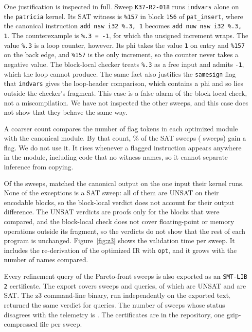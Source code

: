 One justification is inspected in full. Sweep \texttt{K37-R2-018} runs \texttt{indvars} alone on the \texttt{patricia} kernel. Its
SAT witness is \texttt{\%157} in block \texttt{156} of \texttt{pat\_\allowbreak{}insert}, where the canonical instruction
\texttt{add nsw i32 \%.\allowbreak{}3, 1} becomes \texttt{add nuw nsw i32 \%.\allowbreak{}3, 1}. The counterexample is \texttt{\%.\allowbreak{}3 = -1}, for which the
unsigned increment wraps. The value \texttt{\%.\allowbreak{}3} is a loop counter, however. Its phi takes the value \texttt{1} on entry and
\texttt{\%157} on the back edge, and \texttt{\%157} is the only increment, so the counter never takes a negative value. The
block-local checker treats \texttt{\%.\allowbreak{}3} as a free input and admits \texttt{-1}, which the loop cannot produce. The same fact also
justifies the \texttt{samesign} flag that \texttt{indvars} gives the loop-header comparison, which contains a phi and so lies
outside the checker's fragment. This case is a false alarm of the block-local check, not a miscompilation. We have not inspected
the other sweeps, and this case does not show that they behave the same way.

A coarser count compares the number of flag tokens in each optimized module with the canonical module. By that count,
\SatAddingFlagPct{}\% of the SAT sweeps (\SatAddingFlagCount{} sweeps) gain a flag. We do not use it. It rises whenever a flagged
instruction appears anywhere in the module, including code that no witness names, so it cannot separate inference from copying.

Of the \OutputsChecked{} sweeps, \OutputsAgreeing{} matched the canonical output on the one input their kernel runs. None of the
\OutputsDiffering{} exceptions is a SAT sweep: all of them are UNSAT on their encodable blocks, so the block-local verdict does not
account for their output difference. The UNSAT verdicts are proofs only for the blocks that were compared, and the block-local
check does not cover floating-point or memory operations outside its fragment, so the verdicts do not show that the rest of each
program is unchanged. Figure~\ref{fig:z3} shows the validation time per sweep. It includes the re-derivation of the optimized IR
with \texttt{opt}, and it grows with the number of names compared.

Every refinement query of the Pareto-front sweeps is also exported as an \texttt{SMT-LIB 2} certificate. The export covers
\CertSweeps{} sweeps and \CertQueries{} queries, of which \CertSolverUnsat{} are UNSAT and \CertSolverSat{} are SAT. The z3
command-line binary, run independently on the exported text, returned the same verdict for \CertCliAgreement{} queries. The number of
sweeps whose status disagrees with the telemetry is \CertStatusDisagreements{}. The certificates are in the repository, one
gzip-compressed file per sweep.

